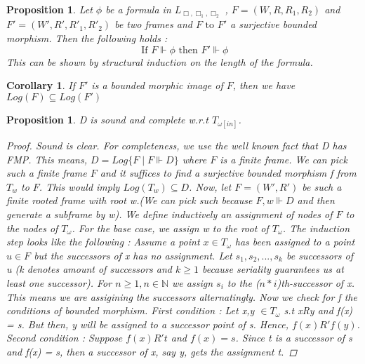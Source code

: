 \documentclass[12pt, a4paper]{scrartcl}
\newtheorem{proposition}[definition]{Proposition}
\newtheorem{corollary}[definition]{Corollary}
\begin{document}
\begin{proposition}
    Let $\phi$ be a formula in $L_{\Box, \Box_1, \Box_2}$ , $F = (W, R, R_1, R_2)$ and $F' = (W', R', R'_1, R'_2)$ be two frames and $F \mbox{ to } F'$ a surjective bounded morphism. Then the following holds :
    $$ \mbox{ If }F \Vdash \phi \mbox{ then } F' \Vdash \phi$$
    This can be shown by structural induction on the length of the formula.
        
\end{proposition}

\begin{corollary}
    If $F'$ is a bounded morphic image of $F$, then we have $Log(F) \subseteq Log(F')$
    
\end{corollary}

\begin{proposition}
    D is sound and complete w.r.t $T_{\omega[in]}$.

    \begin{proof}
    Sound is clear. For completeness, we use the well known fact that D has FMP. This means, $D = Log\{F \mid F \Vdash D\}$ where $F$ is a finite frame.
    We can pick such a finite frame $F$ and it suffices to find a surjective bounded morphism f from $T_w$ to $F$. This would imply $Log(T_w) \subseteq D$. \newline
    Now, let $F = (W', R')$ be such a finite rooted frame with root w.(We can pick such because $F,w \Vdash D$ and then generate a subframe by w). We define 
    inductively an assignment of nodes of $F$ to the nodes of $T_\omega$. For the base case, we assign w to the root of $T_\omega$. The induction step looks like the following : 
    Assume a point $x \in T_\omega$ has been assigned to a point $u \in F$ but the successors of x has no assignment. 
    Let $s_1, s_2, ..., s_k$ be successors of u (k denotes amount of successors and $k\geq 1$ because seriality guarantees us at least one successor).
    For $n \geq 1, n \in \mathbb{N}$ we assign $s_i$ to the ($n * i$)th-successor of x. This means we are assigining the successors alternatingly. \newline
    Now we check for f the conditions of bounded morphism. First condition : Let x,y $\in T_\omega$ s.t xRy and f(x) = s. But then, y will be assigned to a successor point of s. 
    Hence, $f(x) R'f(y)$. Second condition : Suppose $f(x)R't$ and $f(x) = s$. Since t is a successor of s and f(x) = s, then a successor of x, say y, gets the assignment t. 
    
    \end{proof}
        
\end{proposition}
\end{document}
